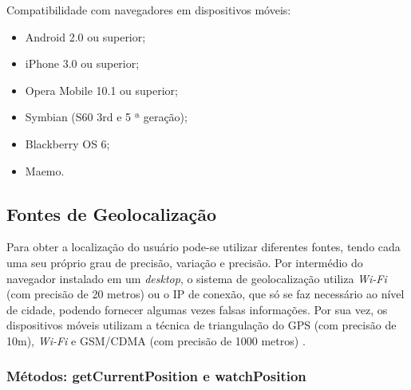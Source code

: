 Compatibilidade com navegadores em dispositivos móveis:
\begin{itemize}
    \item Android 2.0 ou superior;
    \item iPhone 3.0 ou superior;
    \item Opera Mobile 10.1 ou superior;
    \item Symbian (S60 3rd e 5 ª geração);
    \item Blackberry OS 6;
    \item Maemo.
\end{itemize}

\subsection{Fontes de Geolocalização}

Para obter a localização do usuário pode-se utilizar diferentes fontes, tendo cada uma seu próprio grau de precisão, variação e precisão. Por intermédio do navegador instalado em um \textit{desktop}, o sistema de geolocalização utiliza \textit{Wi-Fi} (com precisão de 20 metros) ou o IP de conexão, que só se faz necessário ao nível de cidade, podendo fornecer algumas vezes falsas informações. Por sua vez, os dispositivos móveis utilizam a técnica de triangulação do GPS (com precisão de 10m), \textit{Wi-Fi} e GSM/CDMA (com precisão de 1000 metros) \cite{geolocalizacao:2011}.

\subsubsection{Métodos: getCurrentPosition e watchPosition}



